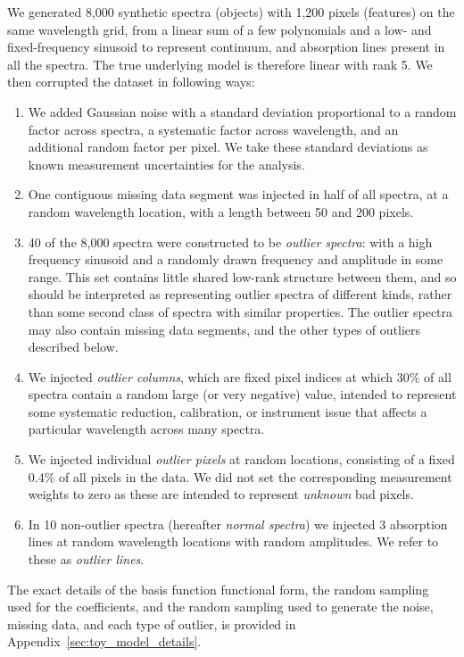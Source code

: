 \documentclass[onecolumn,floatfix,linenumbers,trackchanges]{aastex631}
\begin{document}
We generated 8,000 synthetic spectra (objects) with 1,200 pixels (features) on the same wavelength grid, from a linear sum of a few polynomials and a low- and fixed-frequency sinusoid to represent continuum, and absorption lines present in all the spectra.
The true underlying model is therefore linear with rank 5.
We then corrupted the dataset in following ways:
\begin{enumerate}
    \item We added Gaussian noise with a standard deviation proportional to a random factor across spectra, a systematic factor across wavelength, and an additional random factor per pixel. We take these standard deviations as known measurement uncertainties for the analysis.
    \item One contiguous missing data segment was injected in half of all spectra, at a random wavelength location, with a length between 50 and 200 pixels.
    \item 40 of the 8,000 spectra were constructed to be \emph{outlier spectra}: with a high frequency sinusoid and a randomly drawn frequency and amplitude in some range. This set contains little shared low-rank structure between them, and so should be interpreted as representing outlier spectra of different kinds, rather than some second class of spectra with similar properties.
    The outlier spectra may also contain missing data segments, and the other types of outliers described below.
    \item We injected \emph{outlier columns}, which are fixed pixel indices at which 30\% of all spectra contain a random large (or very negative) value, intended to represent some systematic reduction, calibration, or instrument issue that affects a particular wavelength across many spectra.
    \item We injected individual \emph{outlier pixels} at random locations, consisting of a fixed 0.4\% of all pixels in the data. We did not set the corresponding measurement weights to zero as these are intended to represent \emph{unknown} bad pixels.
    \item In 10 non-outlier spectra (hereafter \emph{normal spectra}) we injected 3 absorption lines at random wavelength locations with random amplitudes. We refer to these as \emph{outlier lines}.
\end{enumerate}
The exact details of the basis function functional form, the random sampling used for the coefficients, and the random sampling used to generate the noise, missing data, and each type of outlier, is provided in Appendix~\ref{sec:toy_model_details}.
\end{document}
